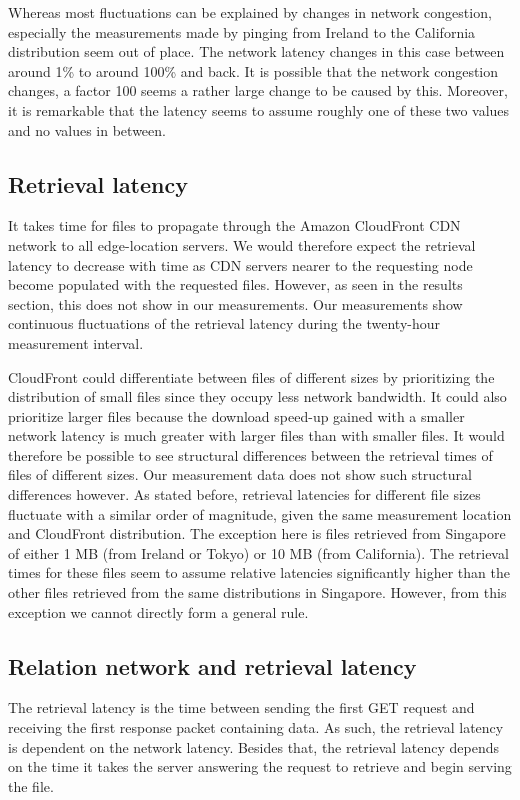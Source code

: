 \documentclass[conference]{IEEEtran}
\begin{document}
Whereas most fluctuations can be explained by changes in network congestion, especially the measurements made by pinging from Ireland to the California distribution seem out of place. The network latency changes in this case between around 1\% to around 100\% and back. It is possible that the network congestion changes, a factor 100 seems a rather large change to be caused by this. Moreover, it is remarkable that the latency seems to assume roughly one of these two values and no values in between.

\subsection{Retrieval latency}
It takes time for files to propagate through the Amazon CloudFront CDN network to all edge-location servers. We would therefore expect the retrieval latency to decrease with time as CDN servers nearer to the requesting node become populated with the requested files. However, as seen in the results section, this does not show in our measurements. Our measurements show continuous fluctuations of the retrieval latency during the twenty-hour measurement interval.

CloudFront could differentiate between files of different sizes by prioritizing the distribution of small files since they occupy less network bandwidth. It could also prioritize larger files because the download speed-up gained with a smaller network latency is much greater with larger files than with smaller files. It would therefore be possible to see structural differences between the retrieval times of files of different sizes. Our measurement data does not show such structural differences however. As stated before, retrieval latencies for different file sizes fluctuate with a similar order of magnitude, given the same measurement location and CloudFront distribution. The exception here is files retrieved from Singapore of either 1 MB (from Ireland or Tokyo) or 10 MB (from California). The retrieval times for these files seem to assume relative latencies significantly higher than the other files retrieved from the same distributions in Singapore. However, from this exception we cannot directly form a general rule.

\subsection{Relation network and retrieval latency}
The retrieval latency is the time between sending the first GET request and receiving the first response packet containing data. As such, the retrieval latency is dependent on the network latency. Besides that, the retrieval latency depends on the time it takes the server answering the request to retrieve and begin serving the file.
\end{document}
